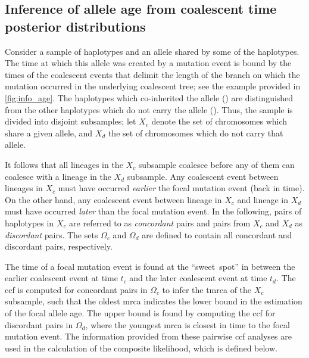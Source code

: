 %
\subsection{Inference of allele age from coalescent time posterior distributions}\label{sec:comp_post_method}
%

Consider a sample of haplotypes and an allele shared by some of the haplotypes.
The time at which this allele was created by a mutation event is bound by the times of the  coalescent events that delimit the length of the branch on which the mutation occurred in the underlying coalescent tree; see the example provided in \cref{fig:info_age}.
The haplotypes which co-inherited the allele () are distinguished from the other haplotypes which do not carry the allele ().
Thus, the sample is divided into  disjoint subsamples; let $X_c$ denote the set of chromosomes which share a given allele, and $X_d$ the set of chromosomes which do not carry that allele.

%

%

It follows that all lineages in the $X_c$ subsample coalesce before any of them can coalesce with a lineage in the $X_d$ subsample.
Any coalescent event between  lineages in $X_c$ must have occurred \emph{earlier}  the focal mutation event (back in time).
On the other hand, any coalescent event between  lineage in $X_c$ and  lineage in $X_d$ must have occurred \emph{later} than the focal mutation event.
In the following, pairs of haplotypes in $X_c$ are referred to as \emph{concordant} pairs and pairs from $X_c$ and $X_d$ as \emph{discordant} pairs.
The sets $\Omega_c$ and $\Omega_d$ are defined to contain all concordant and discordant pairs, respectively.

The time of a focal mutation event is found at the ``sweet~spot'' in between the earlier coalescent event at time $t_c$ and the later coalescent event at time $t_d$.
The \gls{ccf} is computed for concordant pairs in $\Omega_c$ to infer the \gls{tmrca} of the $X_c$ subsample, such that the oldest \gls{mrca} indicates the lower bound in the estimation of the focal allele age.
The upper bound is found by computing the \gls{ccf} for discordant pairs in $\Omega_d$, where the youngest \gls{mrca} is closest in time to the focal mutation event.
The information provided from these pairwise \gls{ccf} analyses are used in the calculation of the composite likelihood, which is defined below.

